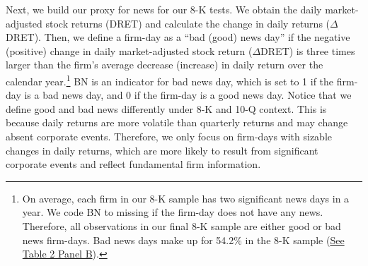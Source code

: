 \documentclass[letterpaper,12pt]{article}
\begin{document}
\begin{spacing}{1.5}
Next, we build our proxy for news for our 8-K tests. We obtain the daily market-adjusted stock returns (DRET) and calculate the change in daily returns ($\Delta$DRET). Then, we define a firm-day as a ``bad (good) news day” if the negative (positive) change in daily market-adjusted stock return ($\Delta$DRET) is three times larger than the firm's average decrease (increase) in daily return over the calendar year.\footnote{On average, each firm in our 8-K sample has two significant news days in a year. We code BN to missing if the firm-day does not have any news. Therefore, all observations in our final 8-K sample are either good or bad news firm-days. Bad news days make up for 54.2\% in the 8-K sample (\hyperref[T2PB]{See Table 2 Panel B}).} BN is an indicator for bad news day, which is set to 1 if the firm-day is a bad news day, and 0 if the firm-day is a good news day. Notice that we define good and bad news differently under 8-K and 10-Q context. This is because daily returns are more volatile than quarterly returns and may change absent corporate events. Therefore, we only focus on firm-days with sizable changes in daily returns, which are more likely to result from significant corporate events and reflect fundamental firm information.


\end{spacing}
\end{document}
